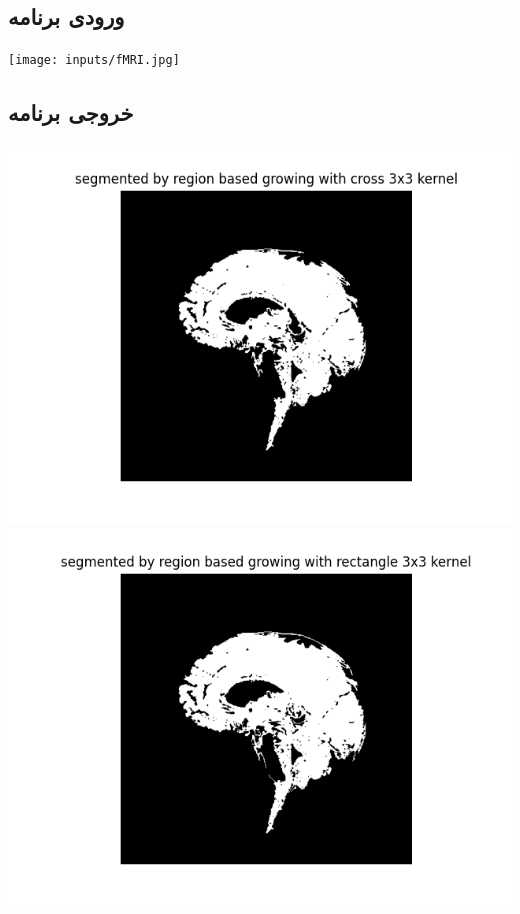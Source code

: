 \documentclass[12pt]{article}
\begin{document}
		\subsection{ورودی برنامه}
		\texttt{[image: inputs/fMRI.jpg]}		
		\subsection{خروجی برنامه}
		\includegraphics[width=15cm]{out4.png}\\
		\includegraphics[width=15cm]{out8.png}
\end{document}
